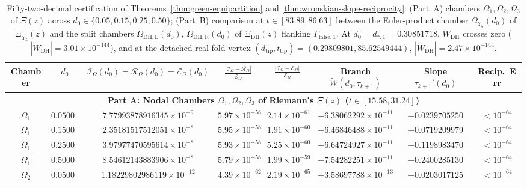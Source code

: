 \documentclass[11pt,reqno]{amsart}
\theoremstyle{definition}
\theoremstyle{remark}
\numberwithin{equation}{section}
\newcommand{\DHf}{\mathrm{DH}}
\begin{document}
\begin{table}[htbp]
\centering
\caption{Fifty-two-decimal certification of Theorems~\ref{thm:green-equipartition} and \ref{thm:wronskian-slope-reciprocity}: (Part~A) chambers $\Omega_1,\Omega_2,\Omega_3$ of $\Xi(z)$ across $d_0 \in \{0.05, 0.15, 0.25, 0.50\}$; (Part~B) comparison at $t \in [83.89, 86.63]$ between the Euler-product chamber $\Omega_{\chi_5}(d_0)$ of $\Xi_{\chi_5}(z)$ and the split chambers $\Omega_{\DHf,\mathrm{L}}(d_0)$, $\Omega_{\DHf,\mathrm{R}}(d_0)$ of $\Xi_{\DHf}(z)$ flanking $\Gamma_{\mathrm{false},1}$. At $d_0 = d_{*,1} = 0.30851718$, $\widetilde{W}_{\DHf}$ crosses zero ($|\widetilde{W}_{\DHf}| = 3.01 \times 10^{-144}$), and at the detached real fold vertex $(d_{\mathrm{tip}},t_{\mathrm{tip}})=(0.29809801, 85.62549444)$, $|\widetilde{W}_{\DHf}| = 2.47 \times 10^{-144}$.}
\label{tab:meso-certification}
\tiny
\setlength{\tabcolsep}{1.6pt}
\renewcommand{\arraystretch}{1.14}
\begin{tabular}{@{}cccccccc@{}}
\toprule
Chamber & $d_0$ & $\mathcal{I}_{\Omega}(d_0) = \mathcal{R}_{\Omega}(d_0) = \mathcal{E}_{\Omega}(d_0)$ & $\frac{|\mathcal{I}_{\Omega}-\mathcal{R}_{\Omega}|}{\mathcal{E}_{\Omega}}$ & $\frac{|\mathcal{I}_{\Omega}-\mathcal{E}_{\Omega}|}{\mathcal{E}_{\Omega}}$ & Branch $\widetilde{W}(d_0,\tau_{k+1})$ & Slope $\tau_{k+1}'(d_0)$ & Recip.\ Err \\
\midrule
\multicolumn{8}{c}{\textbf{Part A: Nodal Chambers $\Omega_1,\Omega_2,\Omega_3$ of Riemann's $\Xi(z)$ ($t \in [15.58, 31.24]$)}} \\
\midrule
$\Omega_1$ & $0.050000$ & $7.77993878916345 \times 10^{-9}$ & $5.97 \times 10^{-58}$ & $2.14 \times 10^{-61}$ & $+6.38062292 \times 10^{-11}$ & $-0.0239705250$ & $< 10^{-64}$ \\
$\Omega_1$ & $0.150000$ & $2.35181517512051 \times 10^{-8}$ & $5.95 \times 10^{-58}$ & $1.91 \times 10^{-60}$ & $+6.46846488 \times 10^{-11}$ & $-0.0719209979$ & $< 10^{-64}$ \\
$\Omega_1$ & $0.250000$ & $3.97977470595614 \times 10^{-8}$ & $5.93 \times 10^{-58}$ & $5.25 \times 10^{-60}$ & $+6.64724927 \times 10^{-11}$ & $-0.1198983470$ & $< 10^{-64}$ \\
$\Omega_1$ & $0.500000$ & $8.54612143883906 \times 10^{-8}$ & $5.79 \times 10^{-58}$ & $1.99 \times 10^{-59}$ & $+7.54282251 \times 10^{-11}$ & $-0.2400285130$ & $< 10^{-64}$ \\
$\Omega_2$ & $0.050000$ & $1.18229802986119 \times 10^{-12}$ & $4.39 \times 10^{-62}$ & $2.19 \times 10^{-65}$ & $+3.58697788 \times 10^{-13}$ & $-0.0203017125$ & $< 10^{-64}$ \\

\end{tabular}
\end{table}
\end{document}
